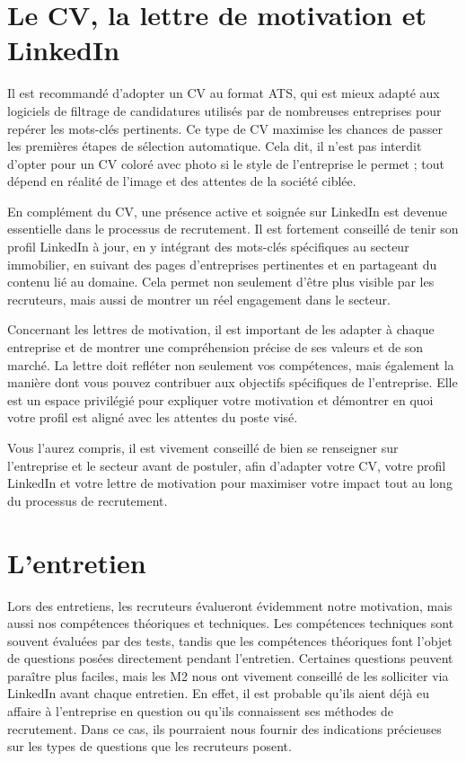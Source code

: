 \documentclass[a4paper, 12pt]{report}
\begin{document}
\section{Le CV, la lettre de motivation et LinkedIn}

Il est recommandé d’adopter un CV au format ATS, qui est mieux adapté aux logiciels de filtrage de candidatures utilisés par de nombreuses entreprises pour repérer les mots-clés pertinents. Ce type de CV maximise les chances de passer les premières étapes de sélection automatique. Cela dit, il n’est pas interdit d’opter pour un CV coloré avec photo si le style de l’entreprise le permet ; tout dépend en réalité de l’image et des attentes de la société ciblée.

En complément du CV, une présence active et soignée sur LinkedIn est devenue essentielle dans le processus de recrutement. Il est fortement conseillé de tenir son profil LinkedIn à jour, en y intégrant des mots-clés spécifiques au secteur immobilier, en suivant des pages d’entreprises pertinentes et en partageant du contenu lié au domaine. Cela permet non seulement d’être plus visible par les recruteurs, mais aussi de montrer un réel engagement dans le secteur.

Concernant les lettres de motivation, il est important de les adapter à chaque entreprise et de montrer une compréhension précise de ses valeurs et de son marché. La lettre doit refléter non seulement vos compétences, mais également la manière dont vous pouvez contribuer aux objectifs spécifiques de l’entreprise. Elle est un espace privilégié pour expliquer votre motivation et démontrer en quoi votre profil est aligné avec les attentes du poste visé.

Vous l’aurez compris, il est vivement conseillé de bien se renseigner sur l’entreprise et le secteur avant de postuler, afin d’adapter votre CV, votre profil LinkedIn et votre lettre de motivation pour maximiser votre impact tout au long du processus de recrutement.

\section{L'entretien} 

Lors des entretiens, les recruteurs évalueront évidemment notre motivation, mais aussi nos compétences théoriques et techniques. Les compétences techniques sont souvent évaluées par des tests, tandis que les compétences théoriques font l'objet de questions posées directement pendant l’entretien. Certaines questions peuvent paraître plus faciles, mais les M2 nous ont vivement conseillé de les solliciter via LinkedIn avant chaque entretien. En effet, il est probable qu’ils aient déjà eu affaire à l’entreprise en question ou qu’ils connaissent ses méthodes de recrutement. Dans ce cas, ils pourraient nous fournir des indications précieuses sur les types de questions que les recruteurs posent.
\end{document}
